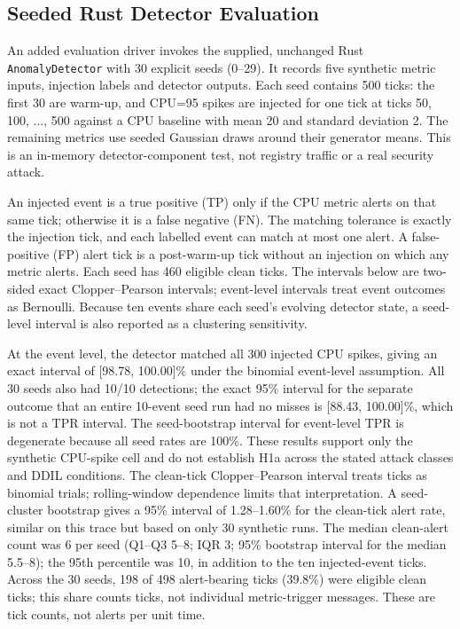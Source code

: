 \documentclass{ieeeaccess}
\begin{document}
\subsection{Seeded Rust Detector Evaluation}
\label{subsec:rust_seeded}

An added evaluation driver invokes the supplied, unchanged Rust \texttt{AnomalyDetector} with 30 explicit seeds (0--29). It records five synthetic metric inputs, injection labels and detector outputs. Each seed contains 500 ticks: the first 30 are warm-up, and CPU=95 spikes are injected for one tick at ticks 50, 100, ..., 500 against a CPU baseline with mean 20 and standard deviation 2. The remaining metrics use seeded Gaussian draws around their generator means. This is an in-memory detector-component test, not registry traffic or a real security attack.

An injected event is a true positive (TP) only if the CPU metric alerts on that same tick; otherwise it is a false negative (FN). The matching tolerance is exactly the injection tick, and each labelled event can match at most one alert. A false-positive (FP) alert tick is a post-warm-up tick without an injection on which any metric alerts. Each seed has 460 eligible clean ticks. The intervals below are two-sided exact Clopper--Pearson intervals; event-level intervals treat event outcomes as Bernoulli. Because ten events share each seed's evolving detector state, a seed-level interval is also reported as a clustering sensitivity.

\begin{table}[ht]
\caption{Earlier host detector study: 30 seeds, 300 spikes and 13,800 clean ticks}
\label{tab:rust_seeded}
\centering
\footnotesize
\setlength{\tabcolsep}{3pt}

\end{table}

At the event level, the detector matched all 300 injected CPU spikes, giving an exact interval of [98.78, 100.00]\% under the binomial event-level assumption. All 30 seeds also had 10/10 detections; the exact 95\% interval for the separate outcome that an entire 10-event seed run had no misses is [88.43, 100.00]\%, which is not a TPR interval. The seed-bootstrap interval for event-level TPR is degenerate because all seed rates are 100\%. These results support only the synthetic CPU-spike cell and do not establish H1a across the stated attack classes and DDIL conditions. The clean-tick Clopper--Pearson interval treats ticks as binomial trials; rolling-window dependence limits that interpretation. A seed-cluster bootstrap gives a 95\% interval of 1.28--1.60\% for the clean-tick alert rate, similar on this trace but based on only 30 synthetic runs. The median clean-alert count was 6 per seed (Q1--Q3 5--8; IQR 3; 95\% bootstrap interval for the median 5.5--8); the 95th percentile was 10, in addition to the ten injected-event ticks. Across the 30 seeds, 198 of 498 alert-bearing ticks (39.8\%) were eligible clean ticks; this share counts ticks, not individual metric-trigger messages. These are tick counts, not alerts per unit time.
\end{document}
